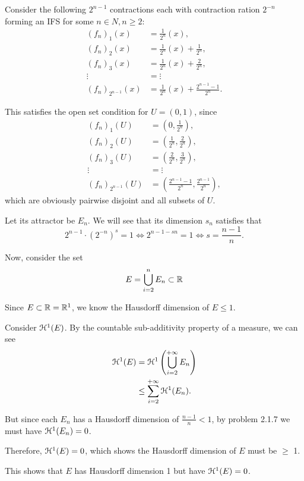 Consider the following \(2^{n - 1}\) contractions each with contraction ration \(2^{-n}\) forming an IFS for some \(n \in N, n \geq 2\):
\begin{align*}
    (f_n)_1 (x) &= \frac{1}{2^n}(x),\\
    (f_n)_2 (x) &= \frac{1}{2^n}(x) + \frac{1}{2^n},\\
    (f_n)_3 (x) &= \frac{1}{2^n}(x) + \frac{2}{2^n},\\
    \vdots &= \vdots\\
    (f_n)_{2^{n-1}}(x) &= \frac{1}{2^n}(x) + \frac{2^{n-1} - 1}{2^n}.
\end{align*}

This satisfies the open set condition for \(U = (0, 1)\), since
\begin{align*}
    (f_n)_1 (U) &= \left(0, \frac{1}{2^n}\right),\\
    (f_n)_2 (U) &= \left(\frac{1}{2^n}, \frac{2}{2^n}\right),\\
    (f_n)_3 (U) &= \left(\frac{2}{2^n}, \frac{3}{2^n}\right),\\
    \vdots &= \vdots\\
    (f_n)_{2^{n-1}}(U) &= \left( \frac{2^{n-1} - 1}{2^n}, \frac{2^{n-1}}{2^n}\right),
\end{align*}
which are obviously pairwise disjoint and all subsets of \(U\).

Let its attractor be \(E_n\). We will see that its dimension \(s_n\) satisfies that
\[
2^{n - 1} \cdot \left(2^{-n}\right)^s = 1 \iff 2^{n - 1 - sn} = 1 \iff s = \frac{n - 1}{n}.
\]

Now, consider the set
\[
E = \bigcup_{i = 2}^{n} E_n \subset \mathbb{R}
\]

Since \(E \subset \mathbb{R} = \mathbb{R}^1\), we know the Hausdorff dimension of \(E \leq 1\).

Consider \(\mathcal{H}^1(E)\). By the countable sub-additivity property of a measure, we can see
\begin{align*}
\mathcal{H}^1(E) &= \mathcal{H}^1 \left(\bigcup_{i = 2}^{+\infty} E_n\right)\\
&\leq \sum_{i = 2}^{+\infty} \mathcal{H}^1(E_n).
\end{align*}

But since each \(E_n\) has a Hausdorff dimension of \(\frac{n - 1}{n} < 1\), by problem 2.1.7 we must have \(\mathcal{H}^1(E_n) = 0\).

Therefore, \(\mathcal{H}^1(E) = 0\), which shows the Hausdorff dimension of \(E\) must be \(\geq\) 1.

This shows that \(E\) has Hausdorff dimension 1 but have \(\mathcal{H}^1(E) = 0\).
